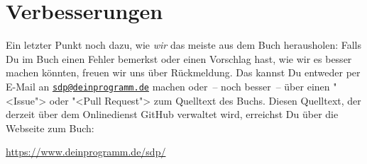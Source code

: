 \section{Verbesserungen}

Ein letzter Punkt noch dazu, wie \emph{wir} das meiste aus dem Buch
herausholen: Falls Du im Buch einen Fehler bemerkst oder einen
Vorschlag hast, wie wir es besser machen könnten, freuen wir uns über
Rückmeldung.  Das kannst Du entweder per E-Mail an
\href{mailto:sdp@deinprogramm.de}{\texttt{sdp@deinprogramm.de}} machen
oder~-- noch besser~-- über einen "<Issue"> oder "<Pull Request"> zum
Quelltext des Buchs.  Diesen Quelltext, der derzeit über dem
Onlinedienst GitHub verwaltet wird, erreichst Du über die Webseite zum
Buch:
%
\begin{center}
  \url{https://www.deinprogramm.de/sdp/}
\end{center}

